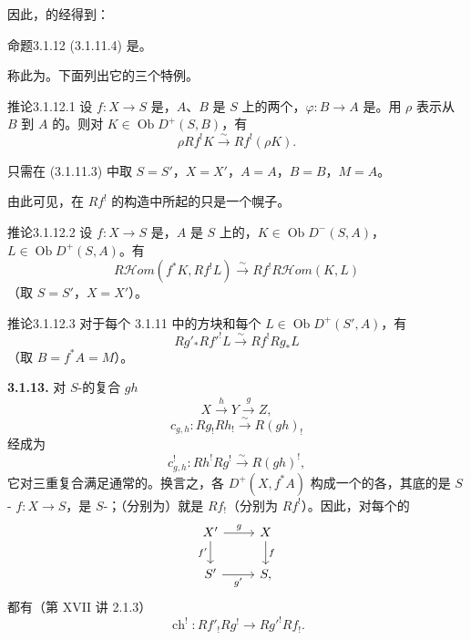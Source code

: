 因此，的经得到：
\begin{SGAresult}{命题}{3.1.12}
 (3.1.11.4) 是。
\end{SGAresult}
称此为。下面列出它的三个特例。

\begin{SGAresult}{推论}{3.1.12.1}
设 $f\colon X\to S$ 是，$A$、$B$ 是 $S$ 上的两个，$\varphi\colon B\to A$ 是。用 $\rho$ 表示从 $B$ 到 $A$ 的。则对 $K\in\operatorname{Ob}D^+(S,B)$，有
\[
 \rho Rf^!K\xrightarrow{\sim}Rf^!(\rho K).
\]
\end{SGAresult}
只需在 (3.1.11.3) 中取 $S=S'$，$X=X'$，$A=A$，$B=B$，$M=A$。

由此可见，在 $Rf^!$ 的构造中所起的只是一个幌子。

\begin{SGAresult}{推论}{3.1.12.2}
设 $f\colon X\to S$ 是，$A$ 是 $S$ 上的，$K\in\operatorname{Ob}D^-(S,A)$，$L\in\operatorname{Ob}D^+(S,A)$。有
\[
 R\mathscr Hom(f^*K,Rf^!L)\xrightarrow{\sim}Rf^!R\mathscr Hom(K,L)
\]
（取 $S=S'$，$X=X'$）。
\end{SGAresult}

\begin{SGAresult}{推论}{3.1.12.3}
对于每个 3.1.11 中的方块和每个 $L\in\operatorname{Ob}D^+(S',A)$，有
\[
 Rg'_*Rf'^!L\xrightarrow{\sim}Rf^!Rg_*L
\]
（取 $B=f^*A=M$）。
\end{SGAresult}

\textbf{3.1.13.} 对 $S$-的复合 $gh$
\[
 X\xrightarrow{h}Y\xrightarrow{g}Z,
\]
\[
 c_{g,h}\colon Rg_!Rh_!\xrightarrow{\sim}R(gh)_!
\]
经成为
\[
 c^!_{g,h}\colon Rh^!Rg^!\xrightarrow{\sim}R(gh)^!,\tag{3.1.13.1}
\]
它对三重复合满足通常的。换言之，各 $D^+(X,f^*A)$ 构成一个的各，其底的是 $S$- $f\colon X\to S$，是 $S$-；（分别为）就是 $Rf_!$（分别为 $Rf^!$）。因此，对每个的
\[
\begin{tikzcd}
X'\arrow[r,"g"]\arrow[d,"f'"']&X\arrow[d,"f"]\\
S'\arrow[r,"g'"']&S,
\end{tikzcd}
\]
都有（第 XVII 讲 2.1.3）
\[
 \operatorname{ch}^!\colon Rf'_!Rg^!\longrightarrow Rg'^!Rf_!.\tag{3.1.13.2}
\]

